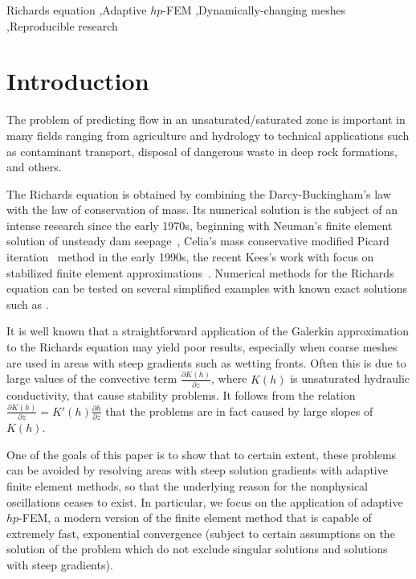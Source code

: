 \documentclass[final,3p,times,twocolumn]{elsarticle}
\begin{document}
\begin{frontmatter}
\begin{keyword}
Richards equation \sep Adaptive $hp$-FEM \sep Dynamically-changing meshes \sep Reproducible research


\end{keyword}

\end{frontmatter}



\section{Introduction}
\label{sec:intro}

The problem of predicting flow in an unsaturated/saturated zone is 
important in many fields ranging from agriculture and hydrology to technical 
applications such as contaminant transport, disposal of dangerous waste in deep 
rock formations, and others.

The Richards equation is obtained by combining the Darcy-Buckingham's law
with the law of conservation of mass. Its numerical solution 
is the subject of an intense research since the early 1970s, beginning with Neuman's 
finite element solution of unsteady dam seepage~\cite{neuman1}, Celia's mass 
conservative modified Picard iteration~\cite{celia} method in the early 1990s, 
 the recent Kees's work with focus on stabilized finite element 
approximations~\cite{kees,kees2,kees3}.
Numerical methods for the Richards equation
can be tested on several simplified examples with known exact solutions 
such as \cite{tracy1,tracy2}. 

It is well known that a straightforward application of the Galerkin approximation
to the Richards equation may yield poor results, especially when coarse meshes are 
used in areas with steep gradients such as wetting fronts.
Often this is due to large values of the convective term 
$\frac{\partial K(h)}{\partial z}$, where $K(h)$ is unsaturated hydraulic 
conductivity, that cause stability problems.
It follows from the relation  $\frac{\partial K(h)}{\partial z}=K'(h)\frac{\partial h}{\partial z}$
that the problems are in fact caused by large slopes of $K(h)$. 

One of the goals of this paper is to show that to certain extent, these problems 
can be avoided by resolving areas with steep solution gradients with adaptive 
finite element methods, so that 
the underlying reason for the nonphysical oscillations ceases to exist. In particular,
we focus on the application of adaptive $hp$-FEM, a modern version of the finite element 
method that is capable of extremely fast, exponential convergence \cite{babuska1}
(subject to certain assumptions on the solution of the problem which do not exclude
singular solutions and solutions with steep gradients).
\end{document}
